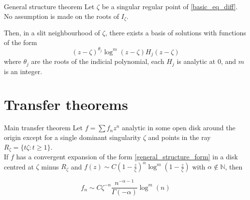 \documentclass[../main.tex]{subfiles}
\begin{document}
\begin{thm}{General structure theorem}
	Let $\zeta$ be a singular regular point of \ref{basic_eq_diff}. No assumption is made on the roots of $I_\zeta$.
	
	Then, in a slit neighbourhood of $\zeta$, there exists a basis of solutions with functions of the form
	\begin{equation}\label{general_structure_form}
	{(z - \zeta)}^{\theta_j} \log^m (z - \zeta) H_j (z - \zeta)
	\end{equation}
	where $\theta_j$ are the roots of the indicial polynomial, each $H_j$ is analytic at 0, and $m$ is an integer. 
\end{thm}

\section{Transfer theorems}

\begin{thm}{Main transfer theorem}
	Let $f = \sum f_n z^n$ analytic in some open disk around the origin except for a single dominant singularity $\zeta$ and points in the ray	$R_\zeta = \{t \zeta : t \geq 1 \}$.\\
	
	If $f$ has a convergent expansion of the form \ref{general_structure_form} in a disk centred at $\zeta$ minus $R_\zeta$ and $f(z) \sim C {\left( 1 - \frac{z}{\zeta} \right)}^\alpha \log^m \left( 1 - \frac{z}{\zeta} \right)$ with $\alpha \not\in \mathbb{N}$,	
	then
	
	$$f_n \sim C {\zeta}^{-n} \frac{n^{-\alpha - 1}}{\Gamma(-\alpha)} \log^m (n)$$
\end{thm}
\end{document}
